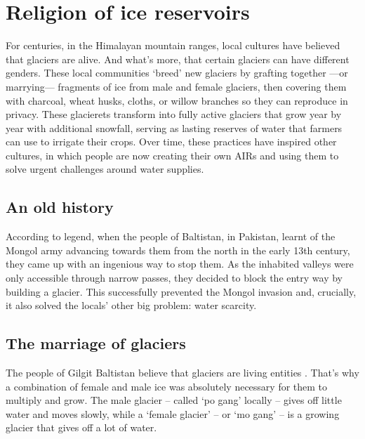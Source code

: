 \chapter{Religion of ice reservoirs}


For centuries, in the Himalayan mountain ranges, local cultures have believed that glaciers are alive. And
what’s more, that certain glaciers can have different genders. These local communities ‘breed’
new glaciers by grafting together —or marrying— fragments of ice from male and female glaciers, then covering them
with charcoal, wheat husks, cloths, or willow branches so they can reproduce in privacy. These glacierets
transform into fully active glaciers that grow year by year with additional snowfall, serving as lasting
reserves of water that farmers can use to irrigate their crops. Over time, these practices have inspired
other cultures, in which people are now creating their own \ac{AIRs} and using them to solve urgent challenges around water supplies.

\section{An old history}

According to legend, when the people of Baltistan, in Pakistan, learnt of the Mongol army advancing towards
them from the north in the early 13th century, they came up with an ingenious way to stop them. As the inhabited
valleys were only accessible through narrow passes, they decided to block the entry way by building a glacier.
This successfully prevented the Mongol invasion and, crucially, it also solved the locals’ other big problem:
water scarcity.

\section{The marriage of glaciers}

The people of Gilgit Baltistan believe that glaciers are living entities
\citep{shabinafarazGlacierMarriagesPakistan2020, khanMarriageGlaciersPrzekroj2020}. That’s why a combination of
female and male ice was absolutely necessary for them to multiply and grow. The male glacier – called ‘po gang’
locally – gives off little water and moves slowly, while a ‘female glacier’ – or ‘mo gang’ – is a growing
glacier that gives off a lot of water. 


